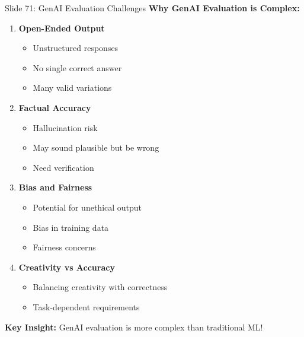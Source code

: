 \documentclass[8pt]{beamer}
\begin{document}
	\begin{frame}{Slide 71: GenAI Evaluation Challenges}
		\fontsize{6.5}{7.5}\selectfont
		\textbf{Why GenAI Evaluation is Complex:}
		\begin{enumerate}
			\item \textbf{Open-Ended Output}
			\begin{itemize}
				\item Unstructured responses
				\item No single correct answer
				\item Many valid variations
			\end{itemize}
			\item \textbf{Factual Accuracy}
			\begin{itemize}
				\item Hallucination risk
				\item May sound plausible but be wrong
				\item Need verification
			\end{itemize}
			\item \textbf{Bias and Fairness}
			\begin{itemize}
				\item Potential for unethical output
				\item Bias in training data
				\item Fairness concerns
			\end{itemize}
			\item \textbf{Creativity vs Accuracy}
			\begin{itemize}
				\item Balancing creativity with correctness
				\item Task-dependent requirements
			\end{itemize}
		\end{enumerate}
		
		\textcolor{myblue}{\textbf{Key Insight:}} GenAI evaluation is more complex than traditional ML!
	\end{frame}
	
\end{document}
